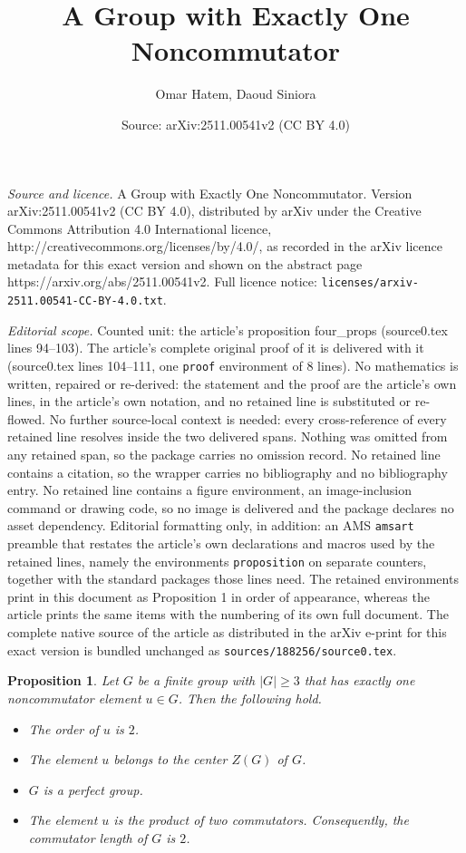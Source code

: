 \documentclass[10pt,a4paper]{amsart}
\title{A Group with Exactly One Noncommutator}
\author{Omar Hatem, Daoud Siniora}
\date{Source: arXiv:2511.00541v2 (CC BY 4.0)}
\newtheorem{proposition}{Proposition}
\begin{document}
\maketitle

\noindent\emph{Source and licence.} A Group with Exactly One Noncommutator. Version arXiv:2511.00541v2 (CC BY 4.0), distributed by arXiv under the Creative Commons Attribution 4.0 International licence, http://creativecommons.org/licenses/by/4.0/, as recorded in the arXiv licence metadata for this exact version and shown on the abstract page https://arxiv.org/abs/2511.00541v2. Full licence notice: \texttt{licenses/arxiv-2511.00541-CC-BY-4.0.txt}.\par\smallskip

\noindent\textit{Editorial scope.} Counted unit: the article's proposition four\_props (source0.tex lines 94--103). The article's complete original proof of it is delivered with it (source0.tex lines 104--111, one \texttt{proof} environment of 8 lines). No mathematics is written, repaired or re-derived: the statement and the proof are the article's own lines, in the article's own notation, and no retained line is substituted or re-flowed.  No further source-local context is needed: every cross-reference of every retained line resolves inside the two delivered spans.  Nothing was omitted from any retained span, so the package carries no omission record.  No retained line contains a citation, so the wrapper carries no bibliography and no bibliography entry.  No retained line contains a figure environment, an image-inclusion command or drawing code, so no image is delivered and the package declares no asset dependency.  Editorial formatting only, in addition: an AMS \texttt{amsart} preamble that restates the article's own declarations and macros used by the retained lines, namely the environments \texttt{proposition} on separate counters, together with the standard packages those lines need.  The retained environments print in this document as Proposition 1 in order of appearance, whereas the article prints the same items with the numbering of its own full document.  The complete native source of the article as distributed in the arXiv e-print for this exact version is bundled unchanged as \texttt{sources/188256/source0.tex}.
\begin{proposition}
Let $G$ be a finite group with $|G|\geq 3$ that has exactly one noncommutator element $u\in G$. Then the following hold.  
\begin{itemize}
            \item The order of $u$ is $2$.
            \item The element $u$ belongs to the center $Z(G)$ of $G$.
            \item $G$ is a perfect group.
            \item The element $u$ is the product of two commutators. Consequently, the commutator length of $G$ is $2$.
\end{itemize}
\label{four_props}
\end{proposition}
\end{document}
